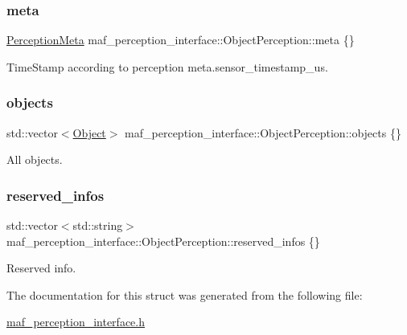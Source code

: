 \subsubsection{\texorpdfstring{meta}{meta}}
{\footnotesize\ttfamily \hyperlink{structmaf__perception__interface_1_1PerceptionMeta}{Perception\+Meta} maf\+\_\+perception\+\_\+interface\+::\+Object\+Perception\+::meta \{\}}



Time\+Stamp according to perception meta.\+sensor\+\_\+timestamp\+\_\+us. 

\mbox{\label{structmaf__perception__interface_1_1ObjectPerception_a5a1f2ebb040a0db3cf3c9d04068d2ba0}} 
\subsubsection{\texorpdfstring{objects}{objects}}
{\footnotesize\ttfamily std\+::vector$<$\hyperlink{structmaf__perception__interface_1_1Object}{Object}$>$ maf\+\_\+perception\+\_\+interface\+::\+Object\+Perception\+::objects \{\}}



All objects. 

\mbox{\label{structmaf__perception__interface_1_1ObjectPerception_a46cd33ff2391fefe278f531b746a0730}} 
\subsubsection{\texorpdfstring{reserved\+\_\+infos}{reserved\_infos}}
{\footnotesize\ttfamily std\+::vector$<$std\+::string$>$ maf\+\_\+perception\+\_\+interface\+::\+Object\+Perception\+::reserved\+\_\+infos \{\}}



Reserved info. 



The documentation for this struct was generated from the following file\+:\begin{DoxyCompactItemize}
\item 
\hyperlink{maf__perception__interface_8h}{maf\+\_\+perception\+\_\+interface.\+h}\end{DoxyCompactItemize}
